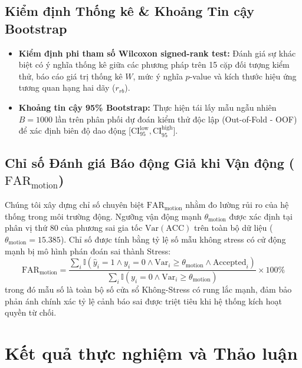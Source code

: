 \documentclass[conference]{IEEEtran}
\begin{document}
\subsection{Kiểm định Thống kê \& Khoảng Tin cậy Bootstrap}
\begin{itemize}
    \item \textbf{Kiểm định phi tham số Wilcoxon signed-rank test:} Đánh giá sự khác biệt có ý nghĩa thống kê giữa các phương pháp trên 15 cặp đối tượng kiểm thử, báo cáo giá trị thống kê $W$, mức ý nghĩa $p$-value và kích thước hiệu ứng tương quan hạng hai dãy ($r_{rb}$).
    \item \textbf{Khoảng tin cậy 95\% Bootstrap:} Thực hiện tái lấy mẫu ngẫu nhiên $B = 1000$ lần trên phân phối dự đoán kiểm thử độc lập (Out-of-Fold - OOF) để xác định biên độ dao động [$\text{CI}_{95}^{\text{low}}, \text{CI}_{95}^{\text{high}}$].
\end{itemize}

\subsection{Chỉ số Đánh giá Báo động Giả khi Vận động \texorpdfstring{($\text{FAR}_{\text{motion}}$)}{(FAR-motion)}}
Chúng tôi xây dựng chỉ số chuyên biệt $\text{FAR}_{\text{motion}}$ nhằm đo lường rủi ro của hệ thống trong môi trường động. Ngưỡng vận động mạnh $\theta_{\text{motion}}$ được xác định tại phân vị thứ 80 của phương sai gia tốc $\text{Var}(\text{ACC})$ trên toàn bộ dữ liệu ($\theta_{\text{motion}} = 15.385$). Chỉ số được tính bằng tỷ lệ số mẫu không stress có cử động mạnh bị mô hình phán đoán sai thành Stress:
\begin{equation}
\text{FAR}_{\text{motion}} = \frac{\sum_{i} \mathbb{I}(\hat{y}_i = 1 \land y_i = 0 \land \text{Var}_i \ge \theta_{\text{motion}} \land \text{Accepted}_i)}{\sum_{i} \mathbb{I}(y_i = 0 \land \text{Var}_i \ge \theta_{\text{motion}})} \times 100\%
\end{equation}
trong đó mẫu số là toàn bộ số cửa sổ Không-Stress có rung lắc mạnh, đảm bảo phản ánh chính xác tỷ lệ cảnh báo sai được triệt tiêu khi hệ thống kích hoạt quyền từ chối.

\section{Kết quả thực nghiệm và Thảo luận}
\end{document}
